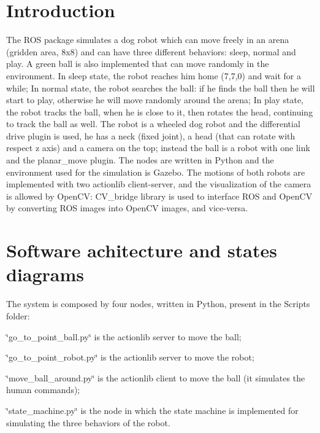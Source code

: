 \section*{Introduction}

The R\+OS package simulates a dog robot which can move freely in an arena (gridden area, 8x8) and can have three different behaviors\+: sleep, normal and play. A green ball is also implemented that can move randomly in the environment. In sleep state, the robot reaches him home (7,7,0) and wait for a while; In normal state, the robot searches the ball\+: if he finds the ball then he will start to play, otherwise he will move randomly around the arena; In play state, the robot tracks the ball, when he is close to it, then rotates the head, continuing to track the ball as well. The robot is a wheeled dog robot and the differential drive plugin is used, he has a neck (fixed joint), a head (that can rotate with respect z axis) and a camera on the top; instead the ball is a robot with one link and the planar\+\_\+move plugin. The nodes are written in Python and the environment used for the simulation is Gazebo. The motions of both robots are implemented with two actionlib client-\/server, and the visualization of the camera is allowed by Open\+CV\+: C\+V\+\_\+bridge library is used to interface R\+OS and Open\+CV by converting R\+OS images into Open\+CV images, and vice-\/versa.

\section*{Software achitecture and states diagrams}

The system is composed by four nodes, written in Python, present in the Scripts folder\+:


\begin{DoxyItemize}
\item \char`\"{}go\+\_\+to\+\_\+point\+\_\+ball.\+py\char`\"{} is the actionlib server to move the ball;
\item \char`\"{}go\+\_\+to\+\_\+point\+\_\+robot.\+py\char`\"{} is the actionlib server to move the robot;
\item \char`\"{}move\+\_\+ball\+\_\+around.\+py\char`\"{} is the actionlib client to move the ball (it simulates the human commands);
\item \char`\"{}state\+\_\+machine.\+py\char`\"{} is the node in which the state machine is implemented for simulating the three behaviors of the robot.
\end{DoxyItemize}

